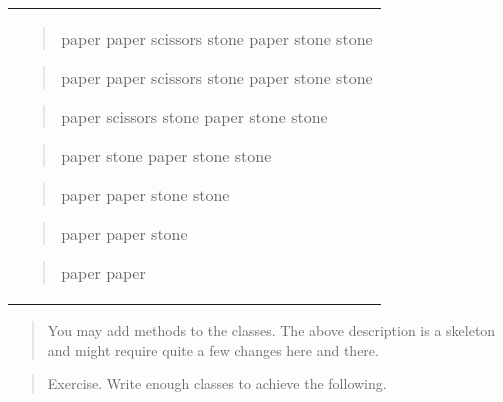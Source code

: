 \documentclass[
]{article}
\begin{document}
\begin{longtable}[]{@{}
  >{\raggedright\arraybackslash}p{}@{}}
\toprule\noalign{}
 \\
\midrule\noalign{}
\endhead
\bottomrule\noalign{}
\endlastfoot
\begin{quote}
paper paper scissors stone paper stone stone
\end{quote}

\begin{quote}
paper paper scissors stone paper stone stone
\end{quote}

\begin{quote}
paper scissors stone paper stone stone
\end{quote}

\begin{quote}
paper stone paper stone stone
\end{quote}

\begin{quote}
paper paper stone stone
\end{quote}

\begin{quote}
paper paper stone
\end{quote}

\begin{quote}
paper paper
\end{quote} \\
\end{longtable}

\begin{quote}
You may add methods to the classes. The above description is a skeleton
and might require quite a few changes here and there.
\end{quote}

\begin{quote}
\end{quote}

\begin{quote}
\end{quote}

\begin{quote}
Exercise. Write enough classes to achieve the following.
\end{quote}
\end{document}

